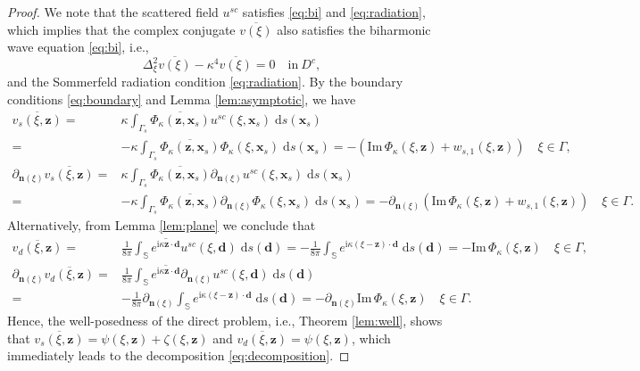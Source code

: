 \documentclass[10pt,a4paper]{article}
\numberwithin{equation}{section}
\begin{document}
\begin{proof}
  We note that the scattered field $u^{sc}$ satisfies \eqref{eq:bi} and \eqref{eq:radiation}, which implies that the complex conjugate $\overline{v(\xi)}$ also satisfies the biharmonic wave equation \eqref{eq:bi}, i.e.,
  \begin{equation*}
\Delta_{\xi }^2 \overline{v(\xi )} -\kappa^4 \overline{v(\xi )} = 0 \quad \mathrm{ in  } ~ D^{c},
  \end{equation*}
  and the Sommerfeld radiation condition \eqref{eq:radiation}. By the boundary conditions \eqref{eq:boundary} and  Lemma \ref{lem:asymptotic}, we have
  \begin{align*}
   \overline{v_{s}(\xi , \bm{ z })} = & \kappa \int_{ \Gamma_{s} } \overline{ \Phi_{\kappa}(\bm{ z },\bm{ x }_s)}u^{sc}(\xi,\bm{ x }_s)  \;\mathrm{d}s(\bm{ x }_s)  \\
    = & -  \kappa \int_{ \Gamma_{s} }\overline{ \Phi_{\kappa}(\bm{ z },\bm{ x }_s)}\Phi_{\kappa}(\xi ,\bm{ x }_s) \;\mathrm{d}s(\bm{ x }_s)
        = -( \mathrm{Im}\, \Phi_{\kappa} (\xi, \bm{ z }) + w_{s,1} (\xi , \bm{ z }) ) \quad \xi \in \Gamma,    \\
    \partial_{\bm{n}(\xi)}    \overline{v_{s}(\xi , \bm{ z })} = & \kappa \int_{ \Gamma_{s} } \overline{ \Phi_{\kappa}(\bm{ z },\bm{ x }_s)} \partial_{\bm{n}(\xi)}  u^{sc}(\xi,\bm{ x }_s)   \;\mathrm{d}s(\bm{ x }_s) \\
    = & -  \kappa \int_{ \Gamma_{s} }\overline{ \Phi_{\kappa}(\bm{ z },\bm{ x }_s)} \partial_{\bm{n}(\xi)} \Phi_{\kappa}(\xi ,\bm{ x }_s) \;\mathrm{d}s(\bm{ x }_s)
      = - \partial_{\bm{n}(\xi)} ( \mathrm{Im}\, \Phi_{\kappa} (\xi, \bm{ z }) + w_{s,1} (\xi , \bm{ z }) ) \quad \xi \in \Gamma.  
  \end{align*}
  Alternatively, from Lemma \ref{lem:plane} we conclude that
    \begin{align*}
   \overline{v_{d}(\xi , \bm{ z })} = &  \frac{1}{8\pi} \int_{ \mathbb{S} } \overline{  e^{\mathrm{ i } \kappa \bm{ z }\cdot \bm{ d }}}u^{sc}(\xi,\bm{ d })  \;\mathrm{d}s(\bm{ d }) 
    =  -  \frac{1}{8\pi} \int_{ \mathbb{S} } e^{\mathrm{ i } \kappa(\xi - \bm{ z })\cdot \bm{ d }} \;\mathrm{d}s(\bm{ d })
        = -\mathrm{Im}\, \Phi_{\kappa} (\xi, \bm{ z }) \quad \xi \in \Gamma,    \\
    \partial_{\bm{n}(\xi)}    \overline{v_{d}(\xi , \bm{ z })} = &  \frac{1}{8\pi} \int_{\mathbb{S} } \overline{ e^{\mathrm{ i } \kappa \bm{ z }\cdot \bm{ d }}} \partial_{\bm{n}(\xi)}  u^{sc}(\xi,\bm{ d })   \;\mathrm{d}s(\bm{ d }) \\
      = & -  \frac{1}{8\pi} \partial_{\bm{n}(\xi)}  \int_{ \mathbb{S} }  e^{\mathrm{ i } \kappa(\xi - \bm{ z })\cdot \bm{ d }}  \;\mathrm{d}s(\bm{ d })
      = - \partial_{\bm{n}(\xi)}  \mathrm{Im}\, \Phi_{\kappa} (\xi, \bm{ z }) \quad \xi \in \Gamma.  
  \end{align*}
  Hence, the well-posedness of the direct problem, i.e., Theorem \ref{lem:well}, shows that  $\overline{v_s(\xi , \bm{ z })}=\psi(\xi ,\bm{ z }) + \zeta(\xi ,\bm{ z })$ and  $\overline{v_d(\xi , \bm{ z })}=\psi(\xi ,\bm{ z })$, which immediately leads to the decomposition \eqref{eq:decomposition}.


\end{proof}
\end{document}
